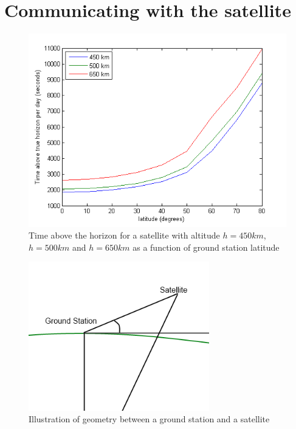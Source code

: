 \section{Communicating with the satellite}

\begin{figure}
  \begin{center}
    \includegraphics[width=1.0\textwidth]{Figures/accesstid450_500_650horizont}
  \end{center}
  \caption[LOS for 450 og 650]{Time above the horizon for a satellite with altitude $h=450km$, $h=500km$ and $h=650km$ as a function of ground station latitude}
  \label{fig:access_horizon}
\end{figure}

\begin{figure}
  \begin{center}
    \includegraphics[width=0.7\textwidth]{Figures/groundstation_satelitte_geometry}
  \end{center}
  \caption[Ground station satellite geometry]{Illustration of geometry between a ground station and a satellite}
  \label{fig:ground_station_satellite_geometry}
\end{figure}

